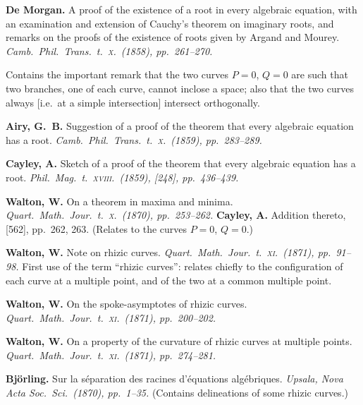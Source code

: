 \documentclass[11pt,a4paper]{article}
\begin{document}
\medskip

\noindent\textbf{De Morgan.} A proof of the existence of a root in every algebraic equation, with an examination and extension of Cauchy's theorem on imaginary roots, and remarks on the proofs of the existence of roots given by Argand and Mourey. \textit{Camb.\ Phil.\ Trans.\ t.\ \textsc{x}.\ (1858), pp.~261--270.}

Contains the important remark that the two curves $P=0$, $Q=0$ are such that two branches, one of each curve, cannot inclose a space; also that the two curves always [i.e.\ at a simple intersection] intersect orthogonally.

\medskip

\noindent\textbf{Airy, G.~B.} Suggestion of a proof of the theorem that every algebraic equation has a root. \textit{Camb.\ Phil.\ Trans.\ t.\ \textsc{x}.\ (1859), pp.~283--289.}

\medskip

\noindent\textbf{Cayley, A.} Sketch of a proof of the theorem that every algebraic equation has a root. \textit{Phil.\ Mag.\ t.\ \textsc{xviii}.\ (1859), [248], pp.~436--439.}

\medskip

\noindent\textbf{Walton, W.} On a theorem in maxima and minima. \textit{Quart.\ Math.\ Jour.\ t.\ \textsc{x}.\ (1870), pp.~253--262.} \textbf{Cayley, A.} Addition thereto, [562], pp.~262, 263. (Relates to the curves $P=0$, $Q=0$.)

\medskip

\noindent\textbf{Walton, W.} Note on rhizic curves. \textit{Quart.\ Math.\ Jour.\ t.\ \textsc{xi}.\ (1871), pp.~91--98.} First use of the term ``rhizic curves'': relates chiefly to the configuration of each curve at a multiple point, and of the two at a common multiple point.

\medskip

\noindent\textbf{Walton, W.} On the spoke-asymptotes of rhizic curves. \textit{Quart.\ Math.\ Jour.\ t.\ \textsc{xi}.\ (1871), pp.~200--202.}

\medskip

\noindent\textbf{Walton, W.} On a property of the curvature of rhizic curves at multiple points. \textit{Quart.\ Math.\ Jour.\ t.\ \textsc{xi}.\ (1871), pp.~274--281.}

\medskip

\noindent\textbf{Bj\"orling.} Sur la s\'eparation des racines d'\'equations alg\'ebriques. \textit{Upsala, Nova Acta Soc.\ Sci.\ (1870), pp.~1--35.} (Contains delineations of some rhizic curves.)
\end{document}
